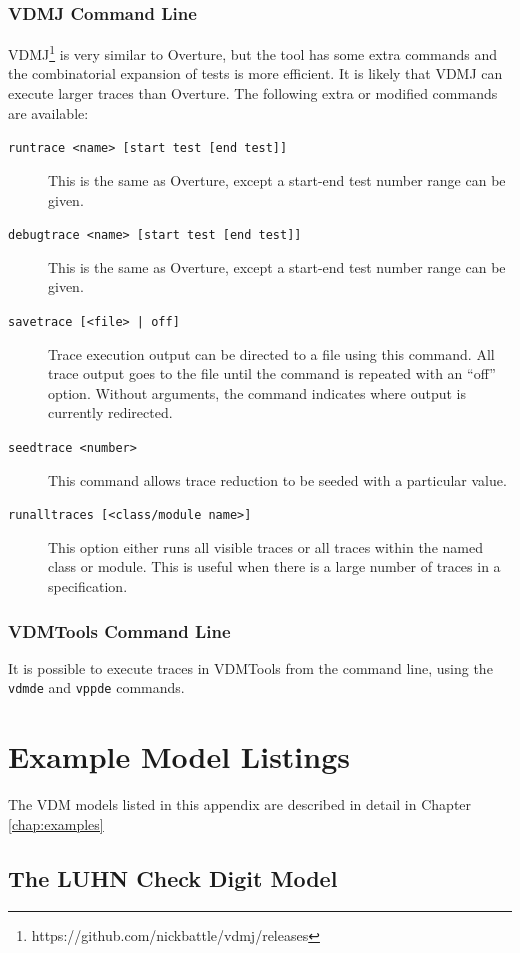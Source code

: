 \documentclass{overturerepchap}
\begin{document}
\subsection{VDMJ Command Line}

VDMJ\footnote{https://github.com/nickbattle/vdmj/releases} is very similar to
Overture, but the tool has some extra commands and the combinatorial expansion
of tests is more efficient. It is likely that VDMJ can execute larger traces
than Overture. The following extra or modified commands are available:

\begin{description}
\item[\texttt{runtrace <name> [start test [end test]]}] This is the same as
Overture, except a start-end test number range can be given.
\item[\texttt{debugtrace <name> [start test [end test]]}] This is the same as
Overture, except a start-end test number range can be given.
\item[\texttt{savetrace [<file> | off]}] Trace execution output can be directed
to a file using this command. All trace output goes to the file until the
command is repeated with an ``off'' option. Without arguments, the command
indicates where output is currently redirected.
\item[\texttt{seedtrace <number>}] This command allows trace reduction to be
seeded with a particular value.
\item[\texttt{runalltraces [<class/module name>]}] This option either runs all
visible traces or all traces within the named class or module. This is useful
when there is a large number of traces in a specification.
\end{description}

\subsection{VDMTools Command Line}

It is possible to execute traces in VDMTools from the command line, using
the \texttt{vdmde} and \texttt{vppde} commands.

\chapter{Example Model Listings}
\label{chap:listings}
The VDM models listed in this appendix are described in detail in Chapter
\ref{chap:examples}

\section{The LUHN Check Digit Model}
\end{document}
